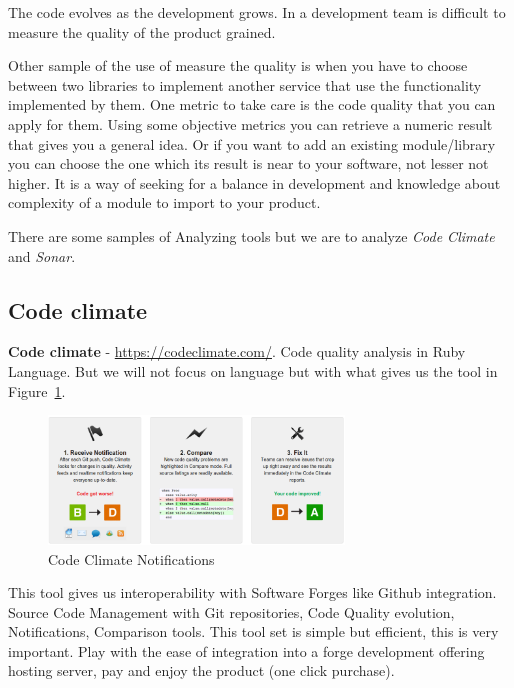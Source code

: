 \documentclass[11pt]{scrartcl}
\begin{document}
\par The code evolves as the development grows. In a development team is difficult to measure the quality of the product grained.

\par Other sample of the use of measure the quality is when you have to choose between two libraries to implement another service that use the functionality implemented by them. One metric to take care is the code quality that you can apply for them. Using some objective metrics you can retrieve a numeric result that gives you a general idea. Or if you want to add an existing module/library you can choose the one which its result is near to your software, not lesser not higher. It is a way of seeking for a balance in development and knowledge about complexity of a module to import to your product.

\par There are some samples of Analyzing tools but we are to analyze \emph{Code Climate} and \emph{Sonar}.

\subsection{Code climate}
\label{sub:code-climate}

\textbf{Code climate} - \url{https://codeclimate.com/}. Code quality analysis in Ruby Language. But we will not focus on language but with what gives us the tool in Figure~\ref{code-climate}.

\begin{figure}[H]
\centering
\includegraphics[width=0.7\textwidth]{code-climate.png}
\caption{Code Climate Notifications}
\label{code-climate}
\end{figure}

\par This tool gives us interoperability with Software Forges like Github integration. Source Code Management with Git repositories, Code Quality evolution, Notifications, Comparison tools. This tool set is simple but efficient, this is very important. Play with the ease of integration into a forge development offering hosting server, pay and enjoy the product (one click purchase).
\end{document}
